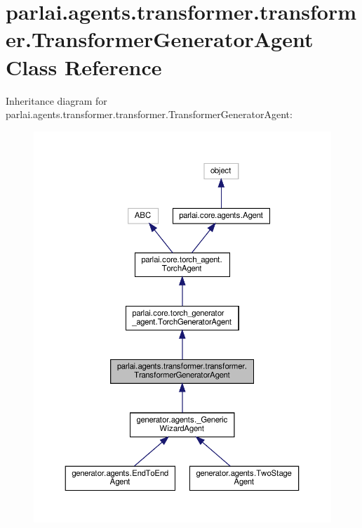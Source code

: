 \hypertarget{classparlai_1_1agents_1_1transformer_1_1transformer_1_1TransformerGeneratorAgent}{}\section{parlai.\+agents.\+transformer.\+transformer.\+Transformer\+Generator\+Agent Class Reference}
\label{classparlai_1_1agents_1_1transformer_1_1transformer_1_1TransformerGeneratorAgent}


Inheritance diagram for parlai.\+agents.\+transformer.\+transformer.\+Transformer\+Generator\+Agent\+:
\nopagebreak
\begin{figure}[H]
\begin{center}
\leavevmode
\includegraphics[width=350pt]{classparlai_1_1agents_1_1transformer_1_1transformer_1_1TransformerGeneratorAgent__inherit__graph}
\end{center}
\end{figure}


